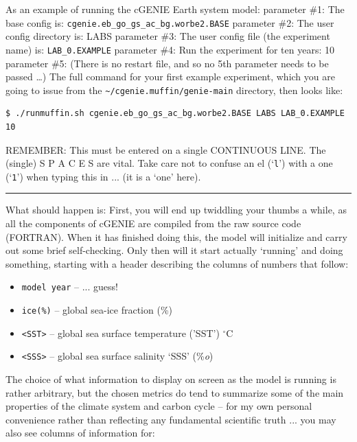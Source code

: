 \documentclass[11pt,fleqn]{book} %
\begin{document}
As an example of running the cGENIE Earth system model:
parameter \#1: The base config is: \texttt{cgenie.eb\_go\_gs\_ac\_bg.worbe2.BASE}
parameter \#2: The user config directory is: LABS
parameter \#3: The user config file (the experiment name) is: \texttt{LAB\_0.EXAMPLE}
parameter \#4: Run the experiment for ten years: 10
parameter \#5: (There is no restart file, and so no 5th parameter needs to be passed …)
The full command for your first example experiment, which you are going to issue from the \texttt{\~}\texttt{/cgenie.muffin/genie-main} directory, then looks like:

\begin{verbatim}
$ ./runmuffin.sh cgenie.eb_go_gs_ac_bg.worbe2.BASE LABS LAB_0.EXAMPLE 10
\end{verbatim}

REMEMBER: This must be entered on a single CONTINUOUS LINE. The (single) S P A C E S are vital. Take care not to confuse an el (‘\texttt{l}’) with a one (‘\texttt{1}’) when typing this in ... (it is a ‘one’ here).

\vspace{1mm}
\noindent\rule{4cm}{0.1mm}
\vspace{2mm}

What should happen is: First, you will end up twiddling your thumbs a while, as all the components of cGENIE are compiled from the raw source code (FORTRAN). When it has finished doing this, the model will initialize and carry out some brief self-checking. Only then will it start actually ‘running’ and doing something, starting with a header describing the columns of numbers that follow:

\begin{itemize}
\item[] \texttt{model year}  -- ... guess!
\item[] \texttt{ice(\%)} -- global sea-ice fraction (\%)
\item[] \texttt{<SST>} -- global sea surface temperature ('SST') $^{\circ}$C
\item[] \texttt{<SSS>} -- global sea surface salinity ‘SSS’ (\%\textit{o})
\end{itemize}

The choice of what information to display on screen as the model is running is rather arbitrary, but the chosen metrics do tend to summarize some of the main properties of the climate system and carbon cycle – for my own personal convenience rather than reflecting any fundamental scientific truth ... you may also see columns of information for: 
\end{document}
